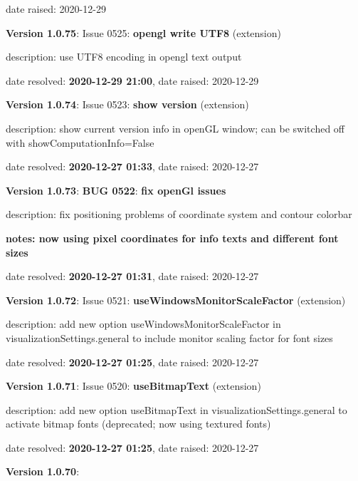 date raised: 2020-12-29   \ei
  \item {\bf Version 1.0.75}: \vspace{-6pt} 
  Issue 0525: {\bf opengl write UTF8}
(extension)
  \bi
  \item {\small description: use UTF8 encoding in opengl text output}
  \item   date resolved: {\bf 2020-12-29 21:00},
date raised: 2020-12-29   \ei
  \item {\bf Version 1.0.74}: \vspace{-6pt} 
  Issue 0523: {\bf show version}
(extension)
  \bi
  \item {\small description: show current version info in openGL window; can be switched off with showComputationInfo=False}
  \item   date resolved: {\bf 2020-12-27 01:33},
date raised: 2020-12-27   \ei
  \item {\bf Version 1.0.73}: \vspace{-6pt} 
{\bf \color{warningRed}  BUG 0522}: {\bf fix openGl issues}
  \bi
  \item {\small description: fix positioning problems of coordinate system and contour colorbar}
  \item {\small \bf notes: now using pixel coordinates for info texts and different font sizes}
  \item   date resolved: {\bf 2020-12-27 01:31},
date raised: 2020-12-27   \ei
  \item {\bf Version 1.0.72}: \vspace{-6pt} 
  Issue 0521: {\bf useWindowsMonitorScaleFactor}
(extension)
  \bi
  \item {\small description: add new option useWindowsMonitorScaleFactor in visualizationSettings.general to include monitor scaling factor for font sizes}
  \item   date resolved: {\bf 2020-12-27 01:25},
date raised: 2020-12-27   \ei
  \item {\bf Version 1.0.71}: \vspace{-6pt} 
  Issue 0520: {\bf useBitmapText}
(extension)
  \bi
  \item {\small description: add new option useBitmapText in visualizationSettings.general to activate bitmap fonts (deprecated; now using textured fonts)}
  \item   date resolved: {\bf 2020-12-27 01:25},
date raised: 2020-12-27   \ei
  \item {\bf Version 1.0.70}: \vspace{-6pt} 
